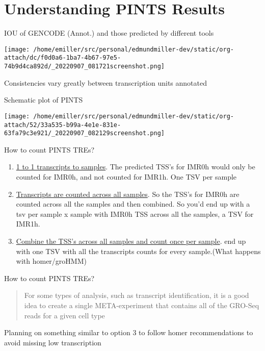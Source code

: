 \documentclass[bigger]{beamer}
\begin{document}
\section*{Understanding PINTS Results}
\label{sec:org8305f42}
\begin{frame}[label={sec:org815508a}]{IOU of GENCODE (Annot.) and those predicted by different tools}
\begin{center}
\texttt{[image: /home/emiller/src/personal/edmundmiller-dev/static/org-attach/dc/f0d0a6-1ba7-4b67-97e5-74b9d4ca892d/\_20220907\_081721screenshot.png]}
\end{center}

Consistencies vary greatly between transcription units annotated
\end{frame}

\begin{frame}[label={sec:orge776468}]{Schematic plot of PINTS}
\begin{center}
\texttt{[image: /home/emiller/src/personal/edmundmiller-dev/static/org-attach/52/33a535-b99a-4e1e-831e-63fa79c3e921/\_20220907\_082129screenshot.png]}
\end{center}
\end{frame}


\begin{frame}[label={sec:org4f5bba1}]{How to count PINTS TREs?}
\begin{enumerate}
\item \uline{1 to 1 transcripts to samples}. The predicted TSS's for IMR0h would only be
counted for IMR0h, and not counted for IMR1h. \alert{One TSV per sample}
\item \uline{Transcripts are counted across all samples}. So the TSS's for IMR0h are
counted across all the samples and then combined. So you'd end up with a \alert{tsv
per sample x sample} with IMR0h TSS across all the samples, a TSV for IMR1h.
\item \uline{Combine the TSS's across all samples and count once per sample}. end up with
\alert{one TSV} with all the transcripts counts for every sample.(What happens with
homer/groHMM)
\end{enumerate}
\end{frame}

\begin{frame}[label={sec:orge94cc12}]{How to count PINTS TREs?}
\begin{quote}
For some types of analysis, such as transcript identification, it is a good idea
to create a single META-experiment that contains all of the GRO-Seq reads for a
given cell type
\end{quote}

Planning on something similar to \alert{option 3} to follow homer recommendations to
avoid missing low transcription
\end{frame}
\end{document}
